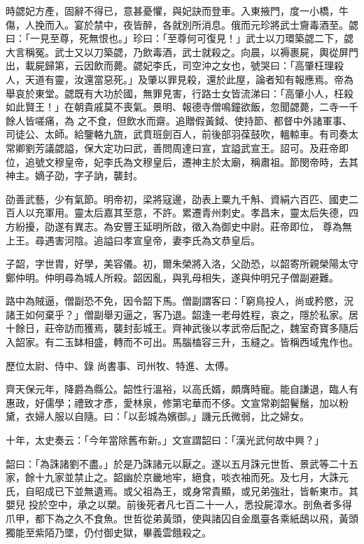 \begin{pinyinscope}
 時勰妃方產，固辭不得已，意甚憂懼，與妃訣而登車。入東掖門，度一小橋，牛
 傷，人挽而入。宴於禁中，夜皆醉，各就別所消息。俄而元珍將武士齎毒酒至。勰曰：「一見至尊，死無恨也。」珍曰：「至尊何可復見！」武士以刀環築勰二下，勰大言稱冤。武士又以刀築勰，乃飲毒酒，武士就殺之。向晨，以褥裹屍，輿從屏門出，載屍歸第，云因飲而薨。勰妃李氏，司空沖之女也，號哭曰：「高肇枉理殺人，天道有靈，汝還當惡死。」及肇以罪見殺，還於此屋，論者知有報應焉。帝為舉哀於東堂。勰既有大功於國，無罪見害，行路士女皆流涕曰：「高肇小人，枉殺如此賢王！」在朝貴戚莫不喪氣。景明、報德寺僧鳴鐘欲飯，忽聞勰薨，二寺一千餘人皆嗟痛，為
 之不食，但飲水而齋。追贈假黃鉞、使持節、都督中外諸軍事、司徒公、太師。給鑒輅九旒，武賁班劍百人，前後部羽葆鼓吹，轀輬車。有司奏太常卿劉芳議勰謚，保大定功曰武，善問周達曰宣，宜謚武宣王。詔可。及莊帝即位，追號文穆皇帝，妃李氏為文穆皇后，遷神主於太廟，稱肅祖。節閔帝時，去其神主。嫡子劭，字子訥，襲封。



 劭善武藝，少有氣節。明帝初，梁將寇邊，劭表上粟九千斛、資絹六百匹、國吏二百人以充軍用。靈太后嘉其至意，不許。累遷青州刺史。孝昌末，靈太后失德，四方紛擾，劭遂有異志。為安豐王延明所啟，徵入為御史中尉。莊帝即位，
 尊為無上王。尋遇害河陰。追謚曰孝宣皇帝，妻李氏為文恭皇后。



 子韶，字世胄，好學，美容儀。初，爾朱榮將入洛，父劭恐，以韶寄所親榮陽太守鄭仲明。仲明尋為城人所殺。韶因亂，與乳母相失，遂與仲明兄子僧副避難。



 路中為賊逼，僧副恐不免，因令韶下馬。僧副謂客曰：「窮鳥投人，尚或矜愍，況諸王如何棄乎？」僧副舉刃逼之，客乃退。韶逢一老母姓程，哀之，隱於私家。居十餘日，莊帝訪而獲焉，襲封彭城王。齊神武後以孝武帝后配之，魏室奇寶多隨后入韶家。有二玉缽相盛，轉而不可出。馬腦榼容三升，玉縫之。皆稱西域鬼作也。



 歷位太尉、侍中、錄
 尚書事、司州牧、特進、太傅。



 齊天保元年，降爵為縣公。韶性行溫裕，以高氏婿，頗膺時寵。能自謙退，臨人有惠政，好儒學；禮致才彥，愛林泉，修第宅華而不侈。文宣常剃韶鬢鬚，加以粉黛，衣婦人服以自隨。曰：「以彭城為嬪御。」譏元氏微弱，比之婦女。



 十年，太史奏云：「今年當除舊布新。」文宣謂韶曰：「漢光武何故中興？」



 韶曰：「為誅諸劉不盡。」於是乃誅諸元以厭之。遂以五月誅元世哲、景武等二十五家，餘十九家並禁止之。韶幽於京畿地牢，絕食，啖衣袖而死。及七月，大誅元氏，自昭成已下並無遺焉。或父祖為王，或身常貴顯，或兄弟強壯，皆斬東市。其嬰兒
 投於空中，承之以槊。前後死者凡七百二十一人，悉投屍漳水。剖魚者多得爪甲，都下為之久不食魚。世哲從弟黃頭，使與諸囚自金凰臺各乘紙鴟以飛，黃頭獨能至紫陌乃墜，仍付御史獄，畢義雲餓殺之。




\end{pinyinscope}

